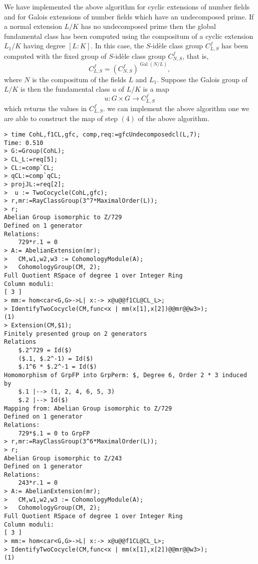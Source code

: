 \documentclass{article}
\theoremstyle{break}
\def\Gal{\mathop{\mathrm{Gal}}\nolimits}
\def\Gal{\mathop{\mathrm{Gal}}\nolimits}
\def\Gal{\mathop{\mathrm{Gal}}\nolimits}
\begin{document}
We have implemented the above algorithm for cyclic extensions of number fields and for Galois extensions of number fields which have an undecomposed prime. If a  normal extension  $L/K$ has no undecomposed prime then the global fundamental class has been computed using the compositum of a cyclic extension $L_{1}/K$ having degree $[L:K]$. In this case, the $S$-id\`ele class group $C_{L,S}^{f} $ has been computed with the fixed group of $S$-id\`ele class group  $C_{N,S}^{f}$, that is, 
\[ C_{L,S}^{f}= \left(C_{N,S}^{f}\right)^{\Gal(N/L)},\]
where $N$ is the compositum of the fields $L$ and $L_{1}$. Suppose the Galois group of $L/K$ is then the fundamental class $u$ of $L/K$ is a map
\[ u:G\times G \rightarrow C_{L,S}^{f}\]
which returns the values in $C_{L,S}^{f}$. we can implement the above algorithm one we are able to construct the map of step $(4)$ of the above algorithm. 

\begin{lstlisting}
> time CohL,f1CL,gfc, comp,req:=gfcUndecomposedcl(L,7);
Time: 0.510
> G:=Group(CohL);
> CL_L:=req[5];
> CL:=comp`CL;
> qCL:=comp`qCL;
> projJL:=req[2];
>  u := TwoCocycle(CohL,gfc);
> r,mr:=RayClassGroup(3^7*MaximalOrder(L));
> r;
Abelian Group isomorphic to Z/729
Defined on 1 generator
Relations:
    729*r.1 = 0
> A:= AbelianExtension(mr);
>   CM,w1,w2,w3 := CohomologyModule(A);
>   CohomologyGroup(CM, 2);
Full Quotient RSpace of degree 1 over Integer Ring
Column moduli:
[ 3 ]
> mm:= hom<car<G,G>->L| x:-> x@u@@f1CL@CL_L>;
> IdentifyTwoCocycle(CM,func<x | mm(x[1],x[2])@@mr@@w3>);
(1)
> Extension(CM,$1);
Finitely presented group on 2 generators
Relations
    $.2^729 = Id($)
    ($.1, $.2^-1) = Id($)
    $.1^6 * $.2^-1 = Id($)
Homomorphism of GrpFP into GrpPerm: $, Degree 6, Order 2 * 3 induced by
    $.1 |--> (1, 2, 4, 6, 5, 3)
    $.2 |--> Id($)
Mapping from: Abelian Group isomorphic to Z/729
Defined on 1 generator
Relations:
    729*$.1 = 0 to GrpFP
> r,mr:=RayClassGroup(3^6*MaximalOrder(L));    
> r;
Abelian Group isomorphic to Z/243
Defined on 1 generator
Relations:
    243*r.1 = 0
> A:= AbelianExtension(mr);
>   CM,w1,w2,w3 := CohomologyModule(A);
>   CohomologyGroup(CM, 2);
Full Quotient RSpace of degree 1 over Integer Ring
Column moduli:
[ 3 ]
> mm:= hom<car<G,G>->L| x:-> x@u@@f1CL@CL_L>;
> IdentifyTwoCocycle(CM,func<x | mm(x[1],x[2])@@mr@@w3>);
(1)





\end{lstlisting}
\end{document}
